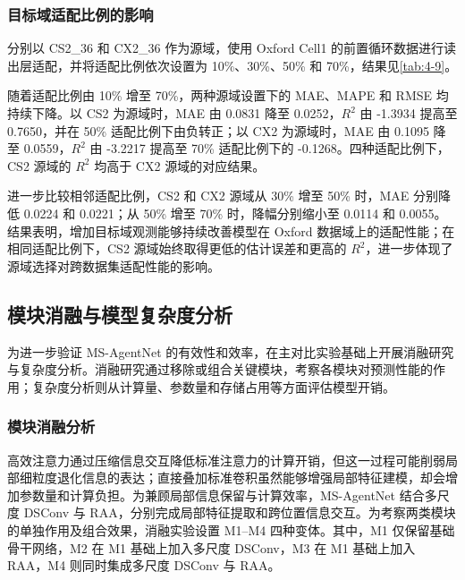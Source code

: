 


\subsubsection{目标域适配比例的影响}

分别以 CS2\_36 和 CX2\_36 作为源域，使用 Oxford Cell1 的前置循环数据进行读出层适配，并将适配比例依次设置为 10\%、30\%、50\% 和 70\%，结果见\cref{tab:4-9}。


随着适配比例由 10\% 增至 70\%，两种源域设置下的 MAE、MAPE 和 RMSE 均持续下降。以 CS2 为源域时，MAE 由 0.0831 降至 0.0252，$R^2$ 由 -1.3934 提高至 0.7650，并在 50\% 适配比例下由负转正；以 CX2 为源域时，MAE 由 0.1095 降至 0.0559，$R^2$ 由 -3.2217 提高至 70\% 适配比例下的 -0.1268。四种适配比例下，CS2 源域的 $R^2$ 均高于 CX2 源域的对应结果。

进一步比较相邻适配比例，CS2 和 CX2 源域从 30\% 增至 50\% 时，MAE 分别降低 0.0224 和 0.0221；从 50\% 增至 70\% 时，降幅分别缩小至 0.0114 和 0.0055。结果表明，增加目标域观测能够持续改善模型在 Oxford 数据域上的适配性能；在相同适配比例下，CS2 源域始终取得更低的估计误差和更高的 $R^2$，进一步体现了源域选择对跨数据集适配性能的影响。


\FloatBarrier


\subsection{模块消融与模型复杂度分析}

为进一步验证 MS-AgentNet 的有效性和效率，在主对比实验基础上开展消融研究与复杂度分析。消融研究通过移除或组合关键模块，考察各模块对预测性能的作用；复杂度分析则从计算量、参数量和存储占用等方面评估模型开销。

\subsubsection{模块消融分析}

高效注意力通过压缩信息交互降低标准注意力的计算开销\cite{ref39,ref40,ref43,ref44}，但这一过程可能削弱局部细粒度退化信息的表达\cite{ref31}；直接叠加标准卷积虽然能够增强局部特征建模，却会增加参数量和计算负担\cite{ref31,ref71}。为兼顾局部信息保留与计算效率，MS-AgentNet 结合多尺度 DSConv 与 RAA，分别完成局部特征提取和跨位置信息交互。为考察两类模块的单独作用及组合效果，消融实验设置 M1–M4 四种变体。其中，M1 仅保留基础骨干网络，M2 在 M1 基础上加入多尺度 DSConv，M3 在 M1 基础上加入 RAA，M4 则同时集成多尺度 DSConv 与 RAA。


